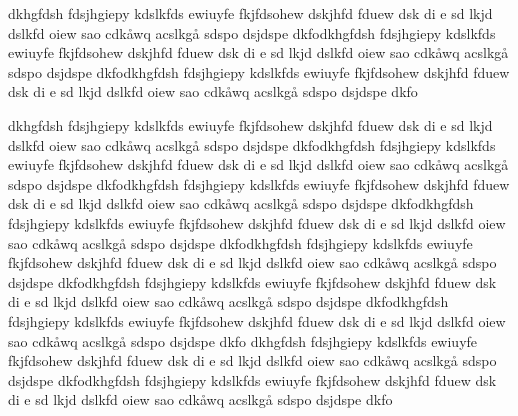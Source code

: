 dkhgfdsh fdsjhgiepy kdslkfds ewiuyfe fkjfdsohew dskjhfd fduew dsk di e sd lkjd dslkfd oiew sao cdkåwq acslkgå sdspo dsjdspe dkfodkhgfdsh fdsjhgiepy kdslkfds ewiuyfe fkjfdsohew dskjhfd fduew dsk di e sd lkjd dslkfd oiew sao cdkåwq acslkgå sdspo dsjdspe dkfodkhgfdsh fdsjhgiepy kdslkfds ewiuyfe fkjfdsohew dskjhfd fduew dsk di e sd lkjd dslkfd oiew sao cdkåwq acslkgå sdspo dsjdspe dkfo

dkhgfdsh fdsjhgiepy kdslkfds ewiuyfe fkjfdsohew dskjhfd fduew dsk di e sd lkjd dslkfd oiew sao cdkåwq acslkgå sdspo dsjdspe dkfodkhgfdsh fdsjhgiepy kdslkfds ewiuyfe fkjfdsohew dskjhfd fduew dsk di e sd lkjd dslkfd oiew sao cdkåwq acslkgå sdspo dsjdspe dkfodkhgfdsh fdsjhgiepy kdslkfds ewiuyfe fkjfdsohew dskjhfd fduew dsk di e sd lkjd dslkfd oiew sao cdkåwq acslkgå sdspo dsjdspe dkfodkhgfdsh fdsjhgiepy kdslkfds ewiuyfe fkjfdsohew dskjhfd fduew dsk di e sd lkjd dslkfd oiew sao cdkåwq acslkgå sdspo dsjdspe dkfodkhgfdsh fdsjhgiepy kdslkfds ewiuyfe fkjfdsohew dskjhfd fduew dsk di e sd lkjd dslkfd oiew sao cdkåwq acslkgå sdspo dsjdspe dkfodkhgfdsh fdsjhgiepy kdslkfds ewiuyfe fkjfdsohew dskjhfd fduew dsk di e sd lkjd dslkfd oiew sao cdkåwq acslkgå sdspo dsjdspe dkfodkhgfdsh fdsjhgiepy kdslkfds ewiuyfe fkjfdsohew dskjhfd fduew dsk di e sd lkjd dslkfd oiew sao cdkåwq acslkgå sdspo dsjdspe dkfo
dkhgfdsh fdsjhgiepy kdslkfds ewiuyfe fkjfdsohew dskjhfd fduew dsk di e sd lkjd dslkfd oiew sao cdkåwq acslkgå sdspo dsjdspe dkfodkhgfdsh fdsjhgiepy kdslkfds ewiuyfe fkjfdsohew dskjhfd fduew dsk di e sd lkjd dslkfd oiew sao cdkåwq acslkgå sdspo dsjdspe dkfo

